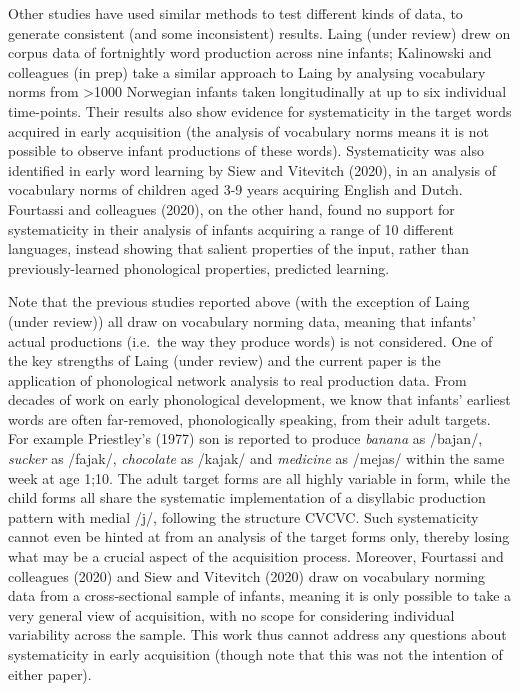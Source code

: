 \documentclass[
  man]{apa6}
\begin{document}
Other studies have used similar methods to test different kinds of data, to generate consistent (and some inconsistent) results. Laing (under review) drew on corpus data of fortnightly word production across nine infants; Kalinowski and colleagues (in prep) take a similar approach to Laing by analysing vocabulary norms from \textgreater1000 Norwegian infants taken longitudinally at up to six individual time-points. Their results also show evidence for systematicity in the target words acquired in early acquisition (the analysis of vocabulary norms means it is not possible to observe infant productions of these words). Systematicity was also identified in early word learning by Siew and Vitevitch (2020), in an analysis of vocabulary norms of children aged 3-9 years acquiring English and Dutch. Fourtassi and colleagues (2020), on the other hand, found no support for systematicity in their analysis of infants acquiring a range of 10 different languages, instead showing that salient properties of the input, rather than previously-learned phonological properties, predicted learning.

Note that the previous studies reported above (with the exception of Laing (under review)) all draw on vocabulary norming data, meaning that infants' actual productions (i.e.~the way they produce words) is not considered. One of the key strengths of Laing (under review) and the current paper is the application of phonological network analysis to real production data. From decades of work on early phonological development, we know that infants' earliest words are often far-removed, phonologically speaking, from their adult targets. For example Priestley's (1977) son is reported to produce \emph{banana} as /bajan/, \emph{sucker} as /fajak/, \emph{chocolate} as /kajak/ and \emph{medicine} as /mejas/ within the same week at age 1;10. The adult target forms are all highly variable in form, while the child forms all share the systematic implementation of a disyllabic production pattern with medial /j/, following the structure CVCVC. Such systematicity cannot even be hinted at from an analysis of the target forms only, thereby losing what may be a crucial aspect of the acquisition process. Moreover, Fourtassi and colleagues (2020) and Siew and Vitevitch (2020) draw on vocabulary norming data from a cross-sectional sample of infants, meaning it is only possible to take a very general view of acquisition, with no scope for considering individual variability across the sample. This work thus cannot address any questions about systematicity in early acquisition (though note that this was not the intention of either paper).
\end{document}
